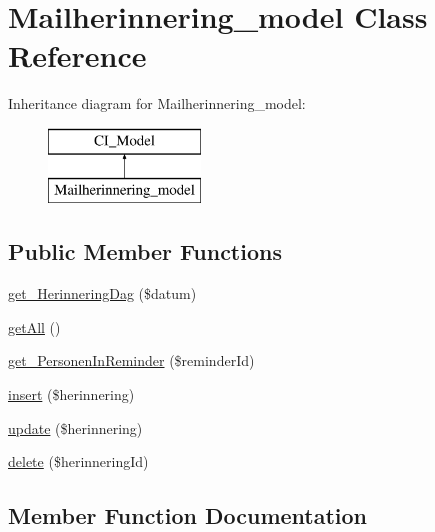 \hypertarget{class_mailherinnering__model}{}\section{Mailherinnering\+\_\+model Class Reference}
\label{class_mailherinnering__model}
Inheritance diagram for Mailherinnering\+\_\+model\+:\begin{figure}[H]
\begin{center}
\leavevmode
\includegraphics[height=2.000000cm]{class_mailherinnering__model}
\end{center}
\end{figure}
\subsection*{Public Member Functions}
\begin{DoxyCompactItemize}
\item 
\mbox{\hyperlink{class_mailherinnering__model_a422d531c661ec9d18803bc7c9ec95a82}{get\+\_\+\+Herinnering\+Dag}} (\$datum)
\item 
\mbox{\hyperlink{class_mailherinnering__model_a52d132c8b5bed589d41796c2bccaeea0}{get\+All}} ()
\item 
\mbox{\hyperlink{class_mailherinnering__model_ae3c0049788b3d538c73c2b6f78fff595}{get\+\_\+\+Personen\+In\+Reminder}} (\$reminder\+Id)
\item 
\mbox{\hyperlink{class_mailherinnering__model_a1e936efd2fa8e6e311a0289dacec6243}{insert}} (\$herinnering)
\item 
\mbox{\hyperlink{class_mailherinnering__model_abcd691276b2a166a51c20bd1507acf9e}{update}} (\$herinnering)
\item 
\mbox{\hyperlink{class_mailherinnering__model_a6c3374952042cc2f90cdbb27cc1bb07d}{delete}} (\$herinnering\+Id)
\end{DoxyCompactItemize}


\subsection{Member Function Documentation}
\mbox{\label{class_mailherinnering__model_a6c3374952042cc2f90cdbb27cc1bb07d}} 
